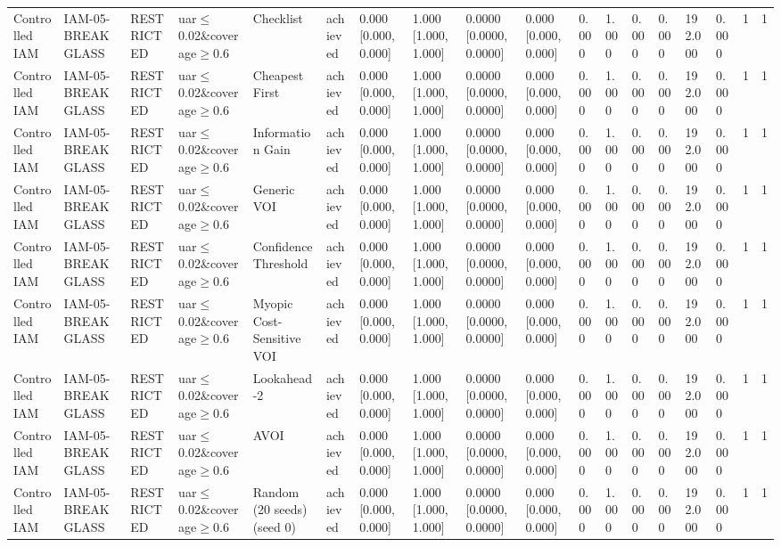 \begin{table}[!ht]
{\begin{tabular}{llllllllllllllllll}
Controlled IAM & IAM-05-BREAKGLASS & RESTRICTED & uar$\le$0.02\&coverage$\ge$0.6 & Checklist & achieved & 0.000 [0.000, 0.000] & 1.000 [1.000, 1.000] & 0.0000 [0.0000, 0.0000] & 0.000 [0.000, 0.000] & 0.000 & 1.000 & 0.000 & 0.000 & 192.000 & 0.000 & 1 & 1 \\
Controlled IAM & IAM-05-BREAKGLASS & RESTRICTED & uar$\le$0.02\&coverage$\ge$0.6 & Cheapest First & achieved & 0.000 [0.000, 0.000] & 1.000 [1.000, 1.000] & 0.0000 [0.0000, 0.0000] & 0.000 [0.000, 0.000] & 0.000 & 1.000 & 0.000 & 0.000 & 192.000 & 0.000 & 1 & 1 \\
Controlled IAM & IAM-05-BREAKGLASS & RESTRICTED & uar$\le$0.02\&coverage$\ge$0.6 & Information Gain & achieved & 0.000 [0.000, 0.000] & 1.000 [1.000, 1.000] & 0.0000 [0.0000, 0.0000] & 0.000 [0.000, 0.000] & 0.000 & 1.000 & 0.000 & 0.000 & 192.000 & 0.000 & 1 & 1 \\
Controlled IAM & IAM-05-BREAKGLASS & RESTRICTED & uar$\le$0.02\&coverage$\ge$0.6 & Generic VOI & achieved & 0.000 [0.000, 0.000] & 1.000 [1.000, 1.000] & 0.0000 [0.0000, 0.0000] & 0.000 [0.000, 0.000] & 0.000 & 1.000 & 0.000 & 0.000 & 192.000 & 0.000 & 1 & 1 \\
Controlled IAM & IAM-05-BREAKGLASS & RESTRICTED & uar$\le$0.02\&coverage$\ge$0.6 & Confidence Threshold & achieved & 0.000 [0.000, 0.000] & 1.000 [1.000, 1.000] & 0.0000 [0.0000, 0.0000] & 0.000 [0.000, 0.000] & 0.000 & 1.000 & 0.000 & 0.000 & 192.000 & 0.000 & 1 & 1 \\
Controlled IAM & IAM-05-BREAKGLASS & RESTRICTED & uar$\le$0.02\&coverage$\ge$0.6 & Myopic Cost-Sensitive VOI & achieved & 0.000 [0.000, 0.000] & 1.000 [1.000, 1.000] & 0.0000 [0.0000, 0.0000] & 0.000 [0.000, 0.000] & 0.000 & 1.000 & 0.000 & 0.000 & 192.000 & 0.000 & 1 & 1 \\
Controlled IAM & IAM-05-BREAKGLASS & RESTRICTED & uar$\le$0.02\&coverage$\ge$0.6 & Lookahead-2 & achieved & 0.000 [0.000, 0.000] & 1.000 [1.000, 1.000] & 0.0000 [0.0000, 0.0000] & 0.000 [0.000, 0.000] & 0.000 & 1.000 & 0.000 & 0.000 & 192.000 & 0.000 & 1 & 1 \\
Controlled IAM & IAM-05-BREAKGLASS & RESTRICTED & uar$\le$0.02\&coverage$\ge$0.6 & AVOI & achieved & 0.000 [0.000, 0.000] & 1.000 [1.000, 1.000] & 0.0000 [0.0000, 0.0000] & 0.000 [0.000, 0.000] & 0.000 & 1.000 & 0.000 & 0.000 & 192.000 & 0.000 & 1 & 1 \\
Controlled IAM & IAM-05-BREAKGLASS & RESTRICTED & uar$\le$0.02\&coverage$\ge$0.6 & Random (20 seeds) (seed 0) & achieved & 0.000 [0.000, 0.000] & 1.000 [1.000, 1.000] & 0.0000 [0.0000, 0.0000] & 0.000 [0.000, 0.000] & 0.000 & 1.000 & 0.000 & 0.000 & 192.000 & 0.000 & 1 & 1 \\

\end{tabular}}
\end{table}
